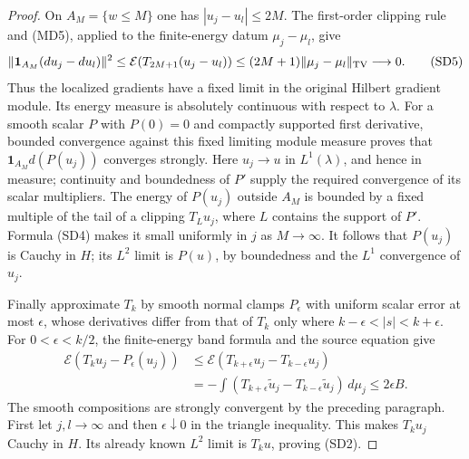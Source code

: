\documentclass[11pt,a4paper]{article}
\numberwithin{equation}{section}
\theoremstyle{definition}
\theoremstyle{remark}
\begin{document}
\begin{proof}
On $A_M=\{w\le M\}$ one has $|u_j-u_l|\le2M$.
The first-order clipping rule and (MD5), applied to the
finite-energy datum $\mu_j-\mu_l$, give
\[
 \|\mathbf1_{A_M}(du_j-du_l)\|^2
      \le\mathcal E(T_{2M+1}(u_j-u_l))
      \le(2M+1)\|\mu_j-\mu_l\|_{\rm TV}\longrightarrow0.
 \tag{SD5}
\]
Thus the localized gradients have a fixed limit in the
original Hilbert gradient module.  Its energy measure is
absolutely continuous with respect to $\lambda$.
For a smooth scalar $P$ with $P(0)=0$ and compactly supported
first derivative, bounded convergence against this fixed
limiting module measure proves that
$\mathbf1_{A_M}d(P(u_j))$ converges strongly.
Here $u_j\to u$ in $L^1(\lambda)$, and hence in measure;
continuity and boundedness of $P'$ supply the required
convergence of its scalar multipliers.
The energy of $P(u_j)$ outside $A_M$ is bounded by a fixed
multiple of the tail of a clipping $T_Lu_j$, where $L$
contains the support of $P'$.  Formula (SD4) makes it small
uniformly in $j$ as $M\to\infty$.
It follows that $P(u_j)$ is Cauchy in $H$; its $L^2$ limit
is $P(u)$, by boundedness and the $L^1$ convergence of $u_j$.

Finally approximate $T_k$ by smooth normal clamps
$P_\epsilon$ with uniform scalar error at most $\epsilon$,
whose derivatives differ from that of $T_k$ only where
$k-\epsilon<|s|<k+\epsilon$.  For $0<\epsilon<k/2$, the
finite-energy band formula and the source equation give
\[
 \begin{split}
 \mathcal E(T_ku_j-P_\epsilon(u_j))
  &\le\mathcal E(T_{k+\epsilon}u_j-T_{k-\epsilon}u_j)\\
  &=-\int(T_{k+\epsilon}\widetilde u_j
                 -T_{k-\epsilon}\widetilde u_j)\,d\mu_j
       \le2\epsilon B.
 \end{split}
 \tag{SD6}
\]
The smooth compositions are strongly convergent by the
preceding paragraph.  First let $j,l\to\infty$ and then
$\epsilon\downarrow0$ in the triangle inequality.
This makes $T_ku_j$ Cauchy in $H$.  Its already known
$L^2$ limit is $T_ku$, proving (SD2).
\end{proof}
\end{document}

